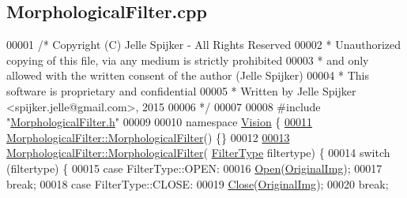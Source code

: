 \hypertarget{_morphological_filter_8cpp_source}{}\subsection{Morphological\+Filter.\+cpp}
\label{_morphological_filter_8cpp_source}

\begin{DoxyCode}
00001 \textcolor{comment}{/* Copyright (C) Jelle Spijker - All Rights Reserved}
00002 \textcolor{comment}{ * Unauthorized copying of this file, via any medium is strictly prohibited}
00003 \textcolor{comment}{ * and only allowed with the written consent of the author (Jelle Spijker)}
00004 \textcolor{comment}{ * This software is proprietary and confidential}
00005 \textcolor{comment}{ * Written by Jelle Spijker <spijker.jelle@gmail.com>, 2015}
00006 \textcolor{comment}{ */}
00007 
00008 \textcolor{preprocessor}{#include "\hyperlink{_morphological_filter_8h}{MorphologicalFilter.h}"}
00009 
00010 \textcolor{keyword}{namespace }\hyperlink{namespace_vision}{Vision} \{
\hypertarget{_morphological_filter_8cpp_source_l00011}{}\hyperlink{class_vision_1_1_morphological_filter_a86da6e12018a61c610942cee292a5b16}{00011} \hyperlink{class_vision_1_1_morphological_filter_a86da6e12018a61c610942cee292a5b16}{MorphologicalFilter::MorphologicalFilter}() \{\}
00012 
\hypertarget{_morphological_filter_8cpp_source_l00013}{}\hyperlink{class_vision_1_1_morphological_filter_adee61b49563bbab5c62699ce3b66f61d}{00013} \hyperlink{class_vision_1_1_morphological_filter_a86da6e12018a61c610942cee292a5b16}{MorphologicalFilter::MorphologicalFilter}(
      \hyperlink{class_vision_1_1_morphological_filter_a1f19c9cb13f0d68778c77d6fd0370868}{FilterType} filtertype) \{
00014   \textcolor{keywordflow}{switch} (filtertype) \{
00015   \textcolor{keywordflow}{case} FilterType::OPEN:
00016     \hyperlink{class_vision_1_1_morphological_filter_a5e57dd85a3c583242b62c5669deab9a0}{Open}(\hyperlink{class_vision_1_1_image_processing_a77c370dab270158a4e9c634e2d3f48e7}{OriginalImg});
00017     \textcolor{keywordflow}{break};
00018   \textcolor{keywordflow}{case} FilterType::CLOSE:
00019     \hyperlink{class_vision_1_1_morphological_filter_ad18de4b3b27d7cd0465cd7f8c3d0b52f}{Close}(\hyperlink{class_vision_1_1_image_processing_a77c370dab270158a4e9c634e2d3f48e7}{OriginalImg});
00020     \textcolor{keywordflow}{break};

\end{DoxyCode}

